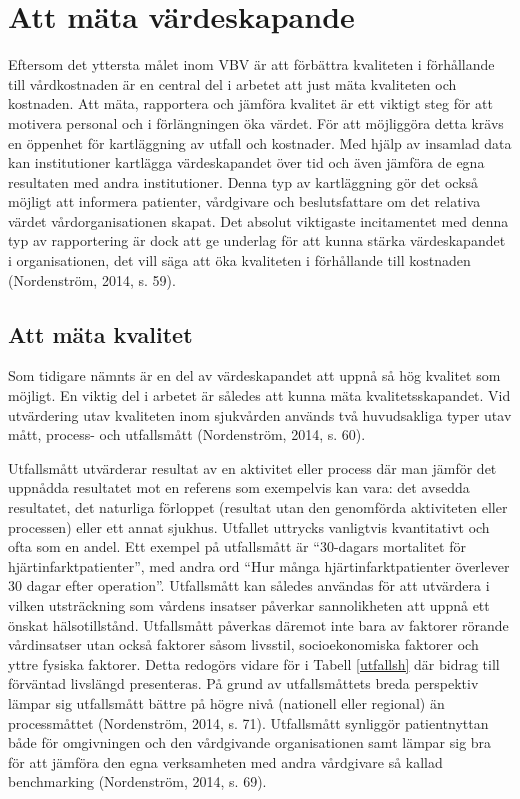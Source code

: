 \section{Att mäta värdeskapande}

Eftersom det yttersta målet inom VBV är att förbättra kvaliteten i förhållande till vårdkostnaden är en central del i arbetet att just mäta kvaliteten och kostnaden. Att mäta, rapportera och jämföra kvalitet är ett viktigt steg för att motivera personal och i förlängningen öka värdet. För att möjliggöra detta krävs en öppenhet för kartläggning av utfall och kostnader. Med hjälp av insamlad data kan institutioner kartlägga värdeskapandet över tid och även jämföra de egna resultaten med andra institutioner. Denna typ av kartläggning gör det också möjligt att informera patienter, vårdgivare och beslutsfattare om det relativa värdet vårdorganisationen skapat. Det absolut viktigaste incitamentet med denna typ av rapportering är dock att ge underlag för att kunna stärka värdeskapandet i organisationen, det vill säga att öka kvaliteten i förhållande till kostnaden (Nordenström, 2014, s. 59).

\subsection{Att mäta kvalitet}

Som tidigare nämnts är en del av värdeskapandet  att uppnå så hög kvalitet som möjligt. En viktig del i arbetet är således att kunna mäta kvalitetsskapandet. Vid utvärdering utav kvaliteten inom sjukvården används två huvudsakliga typer utav mått, process- och utfallsmått (Nordenström, 2014, s. 60).
 
Utfallsmått utvärderar resultat av en aktivitet eller process där man jämför det uppnådda resultatet mot en referens som exempelvis kan vara: det avsedda resultatet, det naturliga förloppet (resultat utan den genomförda aktiviteten eller processen) eller ett annat sjukhus. Utfallet uttrycks vanligtvis kvantitativt och ofta som en andel. Ett exempel på utfallsmått är “30-dagars mortalitet för hjärtinfarktpatienter”, med andra ord “Hur många hjärtinfarktpatienter överlever 30 dagar efter operation”. Utfallsmått kan således användas för att utvärdera i vilken utsträckning som vårdens insatser påverkar sannolikheten att uppnå ett önskat hälsotillstånd. Utfallsmått påverkas däremot inte bara av faktorer rörande vårdinsatser utan också faktorer såsom livsstil, socioekonomiska faktorer och yttre fysiska faktorer. Detta redogörs vidare för i Tabell \ref{utfallsh} där bidrag till förväntad livslängd presenteras. På grund av utfallsmåttets breda perspektiv lämpar sig utfallsmått bättre på högre nivå (nationell eller regional) än processmåttet (Nordenström, 2014, s. 71). Utfallsmått synliggör patientnyttan både för omgivningen och den vårdgivande organisationen samt lämpar sig bra för att jämföra den egna verksamheten med andra vårdgivare så kallad benchmarking (Nordenström, 2014, s. 69).
 
